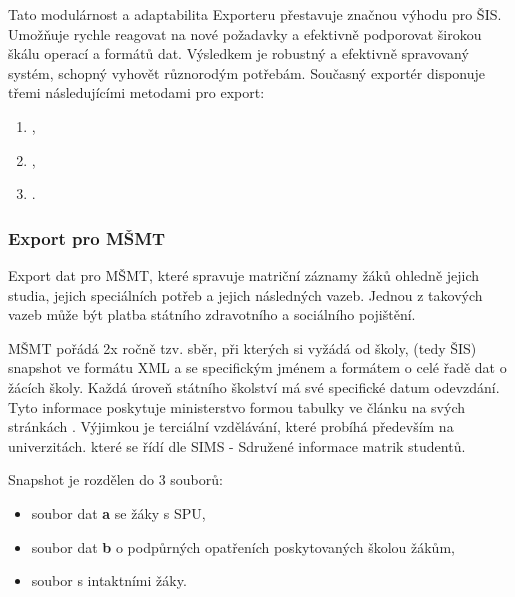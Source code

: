 \documentclass[FM,Proj]{tulthesis}
\begin{document}
Tato modulárnost a adaptabilita Exporteru přestavuje značnou výhodu pro ŠIS. Umožňuje
rychle reagovat na nové požadavky a efektivně podporovat širokou škálu operací
a formátů dat. Výsledkem je robustný a efektivně spravovaný systém, schopný vyhovět
různorodým potřebám. Současný exportér disponuje třemi následujícími metodami
pro export:
\begin{enumerate}
    \item {},
    \item {},
    \item {}.
\end{enumerate}

\subsubsection{Export pro MŠMT}\label{section:export-pro-msmt}
Export dat pro MŠMT, které spravuje matriční 
záznamy žáků ohledně jejich studia, jejich speciálních potřeb a jejich následných vazeb.
Jednou z takových vazeb může být platba státního zdravotního a sociálního pojištění.

MŠMT pořádá 2x ročně tzv. sběr\cite{skolni-matrika}, při kterých si vyžádá od školy,
(tedy ŠIS) snapshot ve formátu XML a se specifickým jménem a formátem o celé řadě 
dat o žácích školy. Každá úroveň státního školství má své specifické datum odevzdání.
Tyto informace poskytuje ministerstvo formou tabulky ve článku na svých stránkách
\cite{msmt-terminy-predavani-dat-2023}. Výjimkou je terciální vzdělávání, které probíhá
především na univerzitách. které se řídí dle SIMS - Sdružené informace matrik studentů.

Snapshot je rozdělen do 3 souborů:
\begin{itemize}
    \item soubor dat \textbf{a} se žáky s SPU,
    \item soubor dat \textbf{b} o podpůrných opatřeních poskytovaných školou žákům,
    \item soubor s intaktními žáky.
\end{itemize}
\end{document}
